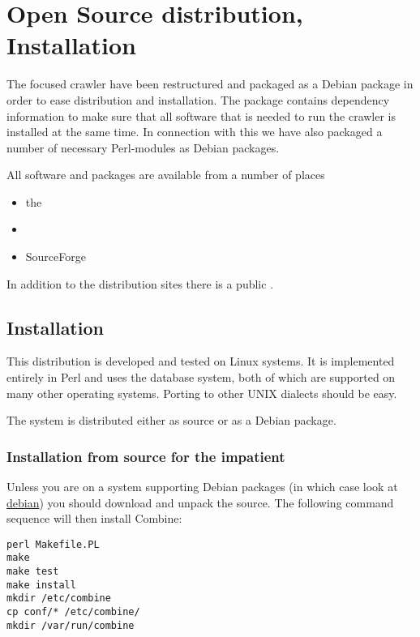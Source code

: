 \section{Open Source distribution, Installation}
\label{distr}
The focused crawler have been restructured and packaged as a Debian
package in order to ease distribution and installation. The package
contains dependency information to make sure that all software that is
needed to run the crawler is installed at the same time. In connection
with this we have also packaged a number of necessary Perl-modules as
Debian packages.

All software and packages are available from a number of places
\begin{itemize}
\item the 
\item {}
\item SourceForge 
\end{itemize}

In addition to the distribution sites there is a public
.

\subsection{Installation}
This distribution is developed and tested on Linux systems.
It is implemented entirely in Perl and uses the 
database system, both of which are supported on many other
operating systems. Porting to other UNIX dialects should be easy.

The system is distributed either as source or as a Debian package.

\subsubsection{Installation from source for the impatient}
Unless you are on a system supporting Debian packages (in which case look at \hyperref{Automated installation}{Automated installation (section }{)}{debian}) you should
download and unpack the source.
The following command sequence will then install Combine:
\begin{verbatim}
perl Makefile.PL
make
make test
make install
mkdir /etc/combine
cp conf/* /etc/combine/
mkdir /var/run/combine
\end{verbatim}


